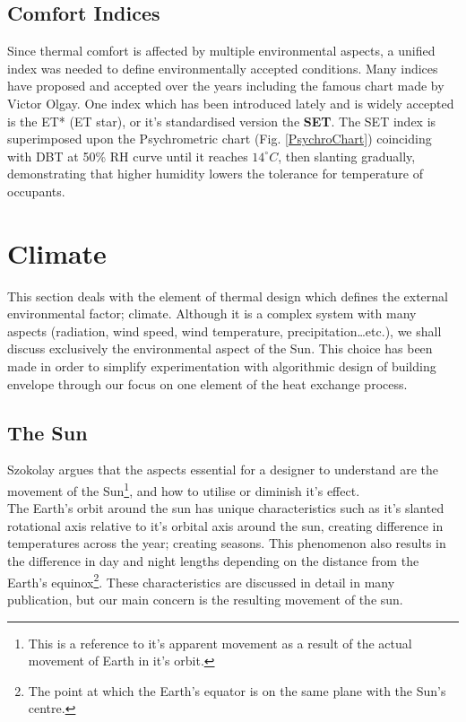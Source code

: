 \subsection{Comfort Indices}
Since thermal comfort is affected by multiple environmental aspects, a unified index was needed to define environmentally accepted conditions. Many indices have proposed and accepted over the years including the famous chart made by Victor Olgay. One index which has been introduced lately and is widely accepted is the ET* (ET star), or it's standardised version the \textbf{SET}. The SET index is superimposed upon the Psychrometric chart (Fig. \ref{PsychroChart}) coinciding with DBT at 50\% RH curve until it reaches $14^\circ C$, then slanting gradually, demonstrating that higher humidity lowers the tolerance for temperature of occupants.

\section{Climate}
This section deals with the element of thermal design which defines the external environmental factor; climate. Although it is a complex system with many aspects (radiation, wind speed, wind temperature, precipitation\ldots etc.), we shall discuss exclusively the environmental aspect of the Sun. This choice has been made in order to simplify experimentation with algorithmic design of building envelope through our focus on one element of the heat exchange process.

\subsection{The Sun}
Szokolay \cite{szokolay08} argues that the aspects essential for a designer to understand are the movement of the Sun\footnote{This is a reference to it's apparent movement as a result of the actual movement of Earth in it's orbit.}, and how to utilise or diminish it's effect.\\ The Earth's orbit around the sun has unique characteristics such as it's slanted rotational axis relative to it's orbital axis around the sun, creating difference in temperatures across the year; creating seasons. This phenomenon also results in the difference in day and night lengths depending on the distance from the Earth's equinox\footnote{The point at which the Earth's equator is on the same plane with the Sun's centre.}. These characteristics are discussed in detail in many publication, but our main concern is the resulting movement of the sun.

